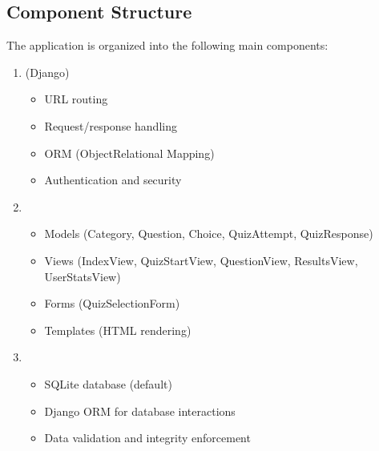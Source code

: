 \documentclass[letterpaper,10pt,english]{sphinxmanual}
\begin{document}
\subsection{Component Structure}
\label{\detokenize{architecture:component-structure}}
\sphinxAtStartPar
The application is organized into the following main components:
\begin{enumerate}
%
\item {} 
\sphinxAtStartPar
{} (Django)
\begin{itemize}
\item {} 
\sphinxAtStartPar
URL routing

\item {} 
\sphinxAtStartPar
Request/response handling

\item {} 
\sphinxAtStartPar
ORM (Object\sphinxhyphen{}Relational Mapping)

\item {} 
\sphinxAtStartPar
Authentication and security

\end{itemize}

\item {} 
\sphinxAtStartPar
{}
\begin{itemize}
\item {} 
\sphinxAtStartPar
Models (Category, Question, Choice, QuizAttempt, QuizResponse)

\item {} 
\sphinxAtStartPar
Views (IndexView, QuizStartView, QuestionView, ResultsView, UserStatsView)

\item {} 
\sphinxAtStartPar
Forms (QuizSelectionForm)

\item {} 
\sphinxAtStartPar
Templates (HTML rendering)

\end{itemize}

\item {} 
\sphinxAtStartPar
{}
\begin{itemize}
\item {} 
\sphinxAtStartPar
SQLite database (default)

\item {} 
\sphinxAtStartPar
Django ORM for database interactions

\item {} 
\sphinxAtStartPar
Data validation and integrity enforcement


\end{itemize}
\end{enumerate}
\end{document}
